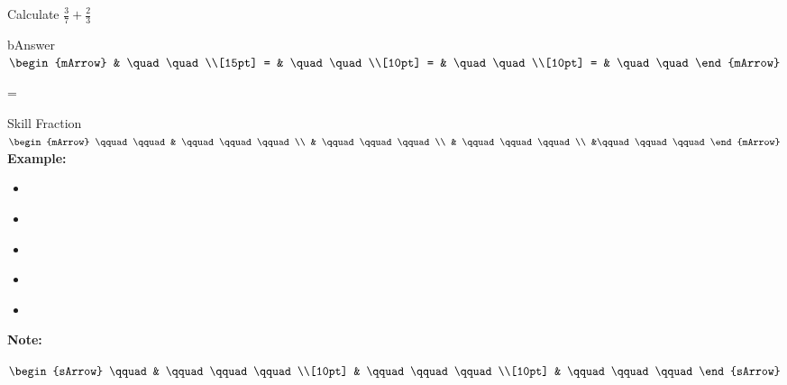 \begin{mtask}[resume]
   \task \begin{exercise} Calculate $ \frac{3}{7} + \frac{2}{3} $
           \begin{envOut}{bAnswer}
             $\begin{mArrow} 
			       & \quad \quad              \\[15pt]
                 = & \quad \quad              \\[10pt]
		   		 = & \quad \quad              \\[10pt]
				 = & \quad \quad 
              \end{mArrow}$
            \begin{shortsolution}  
			     =$ \quad \quad \quad \quad$
			\end{shortsolution}				 
           \end{envOut}
         \end{exercise}
\end{mtask}

\begin{boxSkill}{Skill \thenskill \quad Fraction }
    \noindent%
	 $\begin{mArrow}
        \qquad \qquad &    \qquad\qquad\qquad          \\
                      & \qquad\qquad\qquad \\
			          & \qquad\qquad\qquad  \\
			          &\qquad\qquad\qquad
 	 \end{mArrow}$\\[0.5cm]
	 

	\textbf{Example:}
	\begin{itemize}[leftmargin=0.8cm]
	     \item[] $\qquad\qquad\qquad    $
	     \item[] $\qquad\qquad\qquad     $
	     \item[] $\qquad\qquad\qquad      $ 
	     \item[] $\qquad\qquad\qquad    $
	     \item[] $\qquad\qquad\qquad  $	 
	\end{itemize}
	
	\tcbline
	
    \textbf{Note:}\\[0.6cm]
	\begin{warningEnv}
	    $\begin{sArrow}
	        \qquad   & \qquad\qquad\qquad \\[10pt]
	  	             & \qquad\qquad\qquad                                                                        \\[10pt] 
                     & \qquad\qquad\qquad 				   
		 \end{sArrow}$		   
    \end{warningEnv}
\end{boxSkill}

